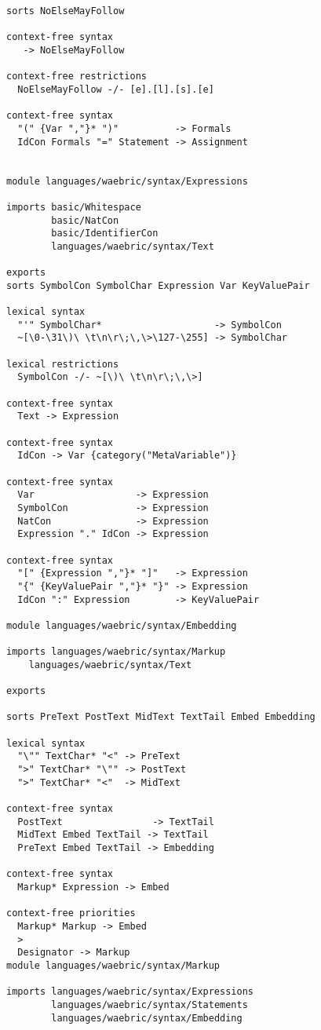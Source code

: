 \documentclass[a4paper]{article}
\begin{document}
\begin{lstlisting}[language=sdf]
sorts NoElseMayFollow

context-free syntax
   -> NoElseMayFollow  

context-free restrictions
  NoElseMayFollow -/- [e].[l].[s].[e]

context-free syntax
  "(" {Var ","}* ")"          -> Formals   
  IdCon Formals "=" Statement -> Assignment  
  

module languages/waebric/syntax/Expressions

imports basic/Whitespace
        basic/NatCon
        basic/IdentifierCon
        languages/waebric/syntax/Text

exports
sorts SymbolCon SymbolChar Expression Var KeyValuePair

lexical syntax
  "'" SymbolChar*                    -> SymbolCon   
  ~[\0-\31\)\ \t\n\r\;\,\>\127-\255] -> SymbolChar  

lexical restrictions
  SymbolCon -/- ~[\)\ \t\n\r\;\,\>]

context-free syntax
  Text -> Expression  

context-free syntax
  IdCon -> Var {category("MetaVariable")} 

context-free syntax
  Var                  -> Expression  
  SymbolCon            -> Expression  
  NatCon               -> Expression  
  Expression "." IdCon -> Expression  

context-free syntax
  "[" {Expression ","}* "]"   -> Expression    
  "{" {KeyValuePair ","}* "}" -> Expression    
  IdCon ":" Expression        -> KeyValuePair  

module languages/waebric/syntax/Embedding

imports languages/waebric/syntax/Markup
	languages/waebric/syntax/Text

exports

sorts PreText PostText MidText TextTail Embed Embedding

lexical syntax
  "\"" TextChar* "<" -> PreText   
  ">" TextChar* "\"" -> PostText  
  ">" TextChar* "<"  -> MidText   

context-free syntax
  PostText                -> TextTail  
  MidText Embed TextTail -> TextTail 
  PreText Embed TextTail -> Embedding

context-free syntax
  Markup* Expression -> Embed

context-free priorities
  Markup* Markup -> Embed
  >
  Designator -> Markup
module languages/waebric/syntax/Markup

imports languages/waebric/syntax/Expressions
        languages/waebric/syntax/Statements
        languages/waebric/syntax/Embedding


\end{lstlisting}
\end{document}
